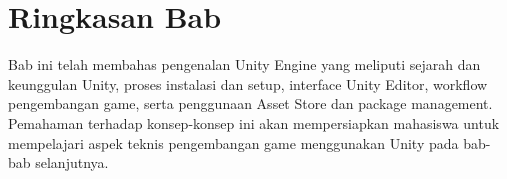 \section{Ringkasan Bab}

Bab ini telah membahas pengenalan Unity Engine yang meliputi sejarah dan keunggulan Unity, proses instalasi dan setup, interface Unity Editor, workflow pengembangan game, serta penggunaan Asset Store dan package management. Pemahaman terhadap konsep-konsep ini akan mempersiapkan mahasiswa untuk mempelajari aspek teknis pengembangan game menggunakan Unity pada bab-bab selanjutnya.
